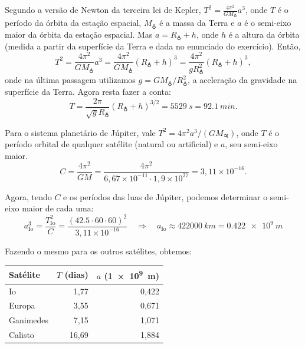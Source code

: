 \documentclass[a4paper]{article}
\newcommand\myrightarrow{\quad\Rightarrow\quad}
\begin{document}
\begin{resolucoes}
\begin{exercicio}
\begin{enumerate}
  \end{enumerate}
  \end{exercicio}
  
  \begin{exercicio}
   Segundo a versão de Newton da terceira lei de Kepler, $T^2 = \frac{4\pi^2}{GM_{\earth}}a^3$, onde $T$ é o período da órbita da estação espacial, $M_{\earth}$ é a massa da Terra e $a$ é o semi-eixo maior da órbita da estação espacial.
  Mas $a = R_{\earth} + h$, onde $h$ é a altura da órbita (medida a partir da superfície da Terra e dada no enunciado do exercício).
  Então,
  \begin{equation*}
  T^2 = \frac{4\pi^2}{GM_{\earth}} a^3 = \frac{4\pi^2}{GM_{\earth}} \left(R_{\earth} + h\right)^3 = \frac{4\pi^2}{gR_{\earth}^2} \left(R_{\earth} + h\right)^3,
  \end{equation*}
  onde na última passagem utilizamos $g = GM_{\earth}/R_{\earth}^2$, a aceleração da gravidade na superfície da Terra.
  Agora resta fazer a conta:
  \begin{equation*}
  T = \frac{2\pi}{\sqrt{g}R_{\earth}}\left(R_{\earth}+h\right)^{3/2} = \SI{5529}{s} = \SI{92.1}{min}.
  \end{equation*}
  \end{exercicio}
  
  \begin{exercicio*}
  \label{ex:Io_cia} Para o sistema planetário de Júpiter, vale $T^2 = 4\pi^2 a^3/\left(GM_{\jupiter}\right)$, onde $T$ é o período orbital de qualquer satélite (natural ou artificial) e $a$, seu semi-eixo maior.
  \begin{equation*}
  C = \frac{4\pi^2}{GM} = \frac{4\pi^2}{6,67\times10^{-11}\cdot 1,9\times10^{27}} = 3,11\times10^{-16}.
  \end{equation*}
  
  Agora, tendo $C$ e os períodos das luas de Júpiter, podemos determinar o semi-eixo maior de cada uma:
  \begin{equation*}
  a_{\text{Io}}^3 = \frac{T_{\text{Io}}^2}{C} = \frac{\left(42.5\cdot 60\cdot 60\right)^2}{3,11\times10^{-16}} \myrightarrow a_{\text{Io}} \approx \SI{422000}{km} = \SI{0.422e9}{m}
  \end{equation*}
  
  Fazendo o mesmo para os outros satélites, obtemos:
  
  \begin{center}
    \begin{tabular}{lrr}
    \toprule
    Satélite  & $T$ (dias) & $a$ (\SI{1e9}{m}) \\
    \midrule
    Io        &  1,77      & 0,422 \\
    Europa    &  3,55      & 0,671 \\
    Ganimedes &  7,15      & 1,071 \\
    Calisto   & 16,69      & 1,884 \\
    \bottomrule
    \end{tabular}
  \end{center}
  

\end{exercicio*}
\end{resolucoes}
\end{document}

